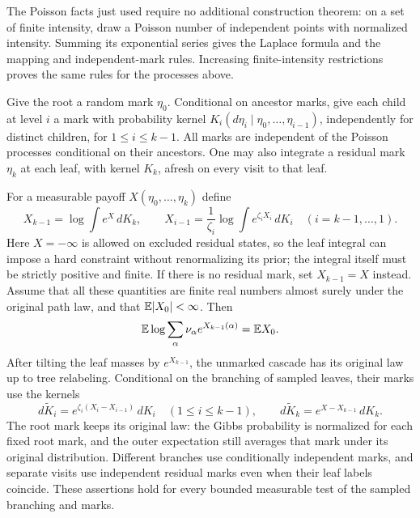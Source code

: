 The Poisson facts just used require no additional construction theorem:
on a set of finite intensity, draw a Poisson number of independent
points with normalized intensity. Summing its exponential series gives
the Laplace formula and the mapping and independent-mark rules.
Increasing finite-intensity restrictions proves the same rules for the
processes above.

\begin{proposition}\label{arr:rpc}
Give the root a random mark $\eta_0$. Conditional on ancestor marks,
give each child at level $i$ a mark with probability kernel
$K_i(d\eta_i\mid\eta_0,\ldots,\eta_{i-1})$, independently for distinct
children, for $1\leq i\leq k-1$. All marks are independent of the
Poisson processes conditional on their ancestors. One may also integrate
a residual mark $\eta_k$ at each leaf, with kernel $K_k$, afresh on
every visit to that leaf.

For a measurable payoff $X(\eta_0,\ldots,\eta_k)$ define
\[
 X_{k-1}=\log\int e^X\,dK_k,
 \qquad
 X_{i-1}=\frac1{\zeta_i}\log\int e^{\zeta_i X_i}\,dK_i
 \quad(i=k-1,\ldots,1).
\]
Here $X=-\infty$ is allowed on excluded residual states, so the leaf
integral can impose a hard constraint without renormalizing its prior;
the integral itself must be strictly positive and finite. If there is
no residual mark, set $X_{k-1}=X$ instead. Assume that all
these quantities are finite real numbers almost surely under the
original path law, and that $\mathbb E|X_0|<\infty$. Then
\begin{equation}\label{arr:rpc-log}
 \mathbb E\log\sum_\alpha\nu_\alpha e^{X_{k-1}(\alpha)}=\mathbb E X_0.
\end{equation}
After tilting the leaf masses by $e^{X_{k-1}}$, the unmarked cascade
has its original law up to tree relabeling. Conditional on the
branching of sampled leaves, their marks use the kernels
\begin{equation}\label{arr:rpc-kernels}
 d\widetilde K_i
 =e^{\zeta_i(X_i-X_{i-1})}\,dK_i
 \quad(1\leq i\leq k-1),
 \qquad
 d\widetilde K_k=e^{X-X_{k-1}}\,dK_k.
\end{equation}
The root mark keeps its original law: the Gibbs probability is
normalized for each fixed root mark, and the outer expectation still
averages that mark under its original distribution. Different branches use
conditionally independent marks, and separate visits use independent
residual marks even when their leaf labels coincide. These assertions
hold for every bounded measurable test of the sampled branching and
marks.
\end{proposition}


